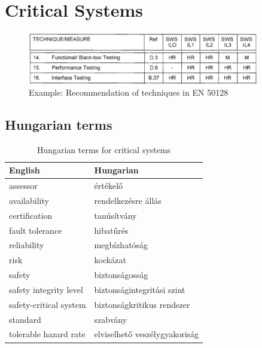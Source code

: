 \chapter{Critical Systems}


\begin{figure}[ht]
    \centering
    \includegraphics[width=0.9\textwidth]{figures/en-50128-example-recommended-techniques}
    \caption{Example: Recommendation of techniques in EN 50128}
    \label{fig:overview:en-50128-technique-recommendation}
\end{figure}

\section{Hungarian terms}

\begin{table}
    \centering
    \small
    \caption{Hungarian terms for critical systems}
    \begin{tabular}{ll}
        \toprule
        \textbf{English} & \textbf{Hungarian} \\
        \midrule
        assessor & értékelő \\
        availability & rendelkezésre állás \\
        certification & tanúsítvány \\
        fault tolerance & hibatűrés \\
        reliability & megbízhatóság \\
        risk & kockázat \\
        safety & biztonságosság \\
        safety integrity level & biztonságintegritási szint \\
        safety-critical system & biztonságkritikus rendszer \\
        standard & szabvány \\
        tolerable hazard rate & elviselhető veszélygyakoriság \\
        \bottomrule
    \end{tabular}
    \label{tab:overview:hungarian-terms-critical-systems}
\end{table} 